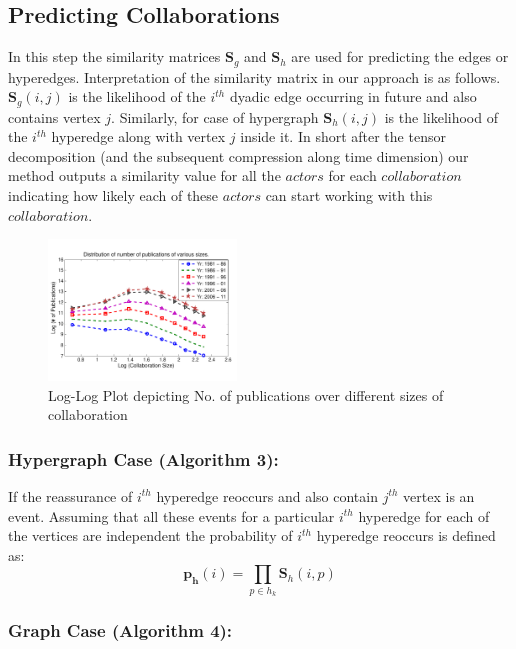 \documentclass{sig-alternate}
\begin{document}
\subsection{Predicting Collaborations}

In this step the similarity matrices $\mathbf{S}_g$ and $\mathbf{S}_h$ are used for predicting the edges or hyperedges. Interpretation of the similarity matrix in our approach is as follows. $\mathbf{S}_g(i,j)$ is the likelihood of the $i^{th}$ dyadic edge occurring in future and also contains vertex $j$. Similarly, for case of hypergraph $\mathbf{S}_h(i,j)$ is the likelihood of the $i^{th}$ hyperedge along with vertex $j$ inside it. In short after the tensor decomposition (and the subsequent compression along time dimension) our method outputs a similarity value for all the $actors$ for each $collaboration$ indicating how likely each of these $actors$ can start working with this $collaboration$.

\begin{figure}[h!]
\centering
\includegraphics[width=50mm]{distribution.pdf}
\caption{Log-Log Plot depicting No. of publications over different sizes of collaboration}
\label{fig:distribution}
\vspace{-1.7em}
\end{figure}

\subsubsection{Hypergraph Case (Algorithm 3):}

If the reassurance of $i^{th}$ hyperedge reoccurs and also contain $j^{th}$ vertex is an event. Assuming that all these events for a particular $i^{th}$ hyperedge for each of the vertices are independent the probability of $i^{th}$ hyperedge reoccurs is defined as: \begin{equation} \mathbf{p_h}(i)=\prod \limits_{p \in h_k} \mathbf{S}_h (i,p) \end{equation} 

\subsubsection{Graph Case (Algorithm 4):}
\end{document}
